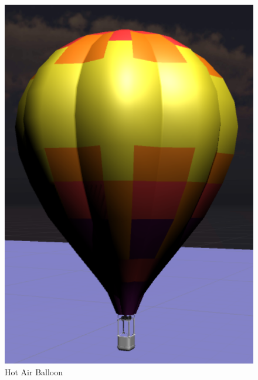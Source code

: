 \documentclass[11pt]{article}
\begin{document}
	\begin{figure}[htbp]
		\centering
		\includegraphics[width=.90\textwidth]{fig/hab.png}
		\caption{Hot Air Balloon}
	\end{figure}
	
\end{document}
